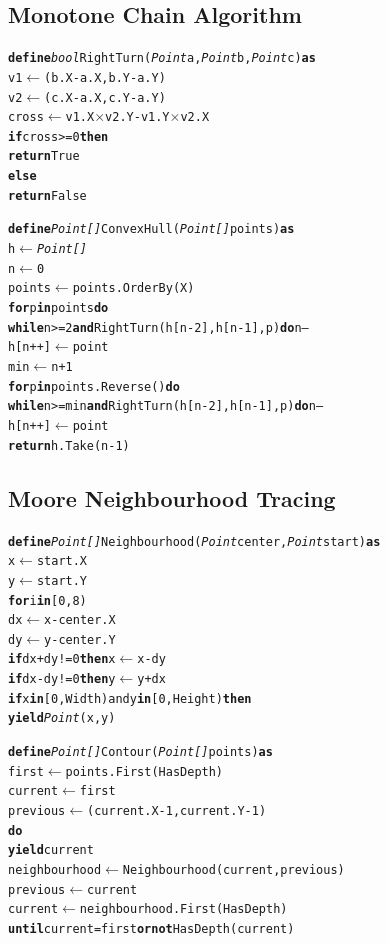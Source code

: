 \documentclass[12pt]{article}
\begin{document}
\subsection{Monotone Chain Algorithm}
\begin{small}
\begin{alltt}
\textbf{define} \textit{bool} RightTurn(\textit{Point} a, \textit{Point} b, \textit{Point} c) \textbf{as}
    v1 \(\leftarrow\) (b.X - a.X, b.Y - a.Y)
    v2 \(\leftarrow\) (c.X - a.X, c.Y - a.Y)
    cross \(\leftarrow\) v1.X \(\times\) v2.Y - v1.Y \(\times\) v2.X
    \textbf{if} cross >= 0 \textbf{then}
        \textbf{return} True
    \textbf{else}
        \textbf{return} False

\textbf{define} \textit{Point[]} ConvexHull(\textit{Point[]} points) \textbf{as}
    h \(\leftarrow\) \textit{Point[]}
    n \(\leftarrow\) 0
    points \(\leftarrow\) points.OrderBy(X)
    \textbf{for} p \textbf{in} points \textbf{do}
        \textbf{while} n >= 2 \textbf{and} RightTurn(h[n-2], h[n-1], p) \textbf{do} n--
        h[n++] \(\leftarrow\) point
    min \(\leftarrow\) n + 1
    \textbf{for} p \textbf{in} points.Reverse() \textbf{do}
        \textbf{while} n >= min \textbf{and} RightTurn(h[n-2], h[n-1], p) \textbf{do} n--
        h[n++] \(\leftarrow\) point
    \textbf{return} h.Take(n - 1)
\end{alltt}
\end{small}


\newpage
\subsection{Moore Neighbourhood Tracing}
\begin{small}
\begin{alltt}
\textbf{define} \textit{Point[]} Neighbourhood(\textit{Point} center, \textit{Point} start) \textbf{as}
    x \(\leftarrow\) start.X
    y \(\leftarrow\) start.Y
    \textbf{for} i \textbf{in} [0,8)
        dx \(\leftarrow\) x - center.X
        dy \(\leftarrow\) y - center.Y
        \textbf{if} dx + dy != 0 \textbf{then} x \(\leftarrow\) x - dy
        \textbf{if} dx - dy != 0 \textbf{then} y \(\leftarrow\) y + dx
        \textbf{if} x \textbf{in} [0, Width) and y \textbf{in} [0, Height) \textbf{then}
            \textbf{yield} \textit{Point}(x, y)

\textbf{define} \textit{Point[]} Contour(\textit{Point[]} points) \textbf{as}
    first \(\leftarrow\) points.First(HasDepth)
    current \(\leftarrow\) first
    previous \(\leftarrow\) (current.X - 1, current.Y - 1)
    \textbf{do}
         \textbf{yield} current
         neighbourhood \(\leftarrow\) Neighbourhood(current, previous)
         previous \(\leftarrow\) current
         current \(\leftarrow\) neighbourhood.First(HasDepth)
    \textbf{until} current = first \textbf{or not} HasDepth(current)
\end{alltt}
\end{small}
\end{document}
